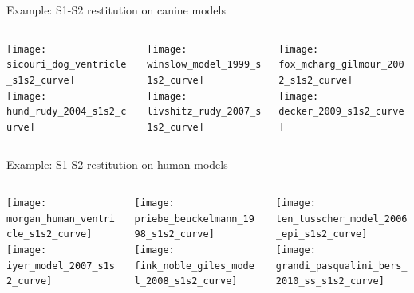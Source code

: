 \documentclass[t,xcolor={usenames,dvipsnames}]{beamer}
\begin{document}
\begin{frame}{Example: S1-S2 restitution on canine models}
\begin{columns}[T]
\begin{column}{.33\linewidth}
\begin{center}
\texttt{[image: sicouri\_dog\_ventricle\_s1s2\_curve]}\\
\vspace{.1cm}
\texttt{[image: hund\_rudy\_2004\_s1s2\_curve]}
\end{center}
\end{column}
\begin{column}{.33\linewidth}
\begin{center}
\texttt{[image: winslow\_model\_1999\_s1s2\_curve]}\\
\vspace{.1cm}
\texttt{[image: livshitz\_rudy\_2007\_s1s2\_curve]}
\end{center}
\end{column}
\begin{column}{.33\linewidth}
\begin{center}
\texttt{[image: fox\_mcharg\_gilmour\_2002\_s1s2\_curve]}\\
\vspace{.1cm}
\texttt{[image: decker\_2009\_s1s2\_curve]}
\end{center}
\end{column}
\end{columns}
\end{frame}

\begin{frame}{Example: S1-S2 restitution on human models}
\begin{columns}[T]
\begin{column}{.33\linewidth}
\begin{center}
\texttt{[image: morgan\_human\_ventricle\_s1s2\_curve]}\\
\vspace{.1cm}
\texttt{[image: iyer\_model\_2007\_s1s2\_curve]}
\end{center}
\end{column}
\begin{column}{.33\linewidth}
\begin{center}
\texttt{[image: priebe\_beuckelmann\_1998\_s1s2\_curve]}\\
\vspace{.1cm}
\texttt{[image: fink\_noble\_giles\_model\_2008\_s1s2\_curve]}
\end{center}
\end{column}
\begin{column}{.33\linewidth}
\begin{center}
\texttt{[image: ten\_tusscher\_model\_2006\_epi\_s1s2\_curve]}\\
\vspace{.1cm}
\texttt{[image: grandi\_pasqualini\_bers\_2010\_ss\_s1s2\_curve]}
\end{center}
\end{column}
\end{columns}
\end{frame}
\end{document}
